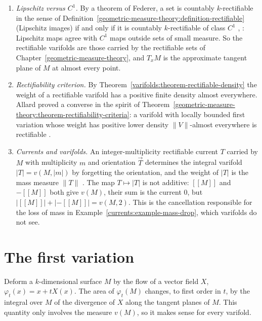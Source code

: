 \begin{remark}\label{varifolds:remark-rectifiable}
\begin{enumerate}
\item \emph{Lipschitz versus $C^1$.} By a theorem of Federer, a set is countably $k$-rectifiable in the sense of Definition~\ref{geometric-measure-theory:definition-rectifiable} (Lipschitz images) if and only if
it is countably $k$-rectifiable of class $C^1$ \cite{federer-gmt}, \cite{simon-gmt}: Lipschitz maps agree with $C^1$ maps outside sets of small measure. So the rectifiable varifolds are those carried by
the rectifiable sets of Chapter~\ref{geometric-measure-theory}, and $T_xM$ is the approximate tangent plane of $M$ at almost every point.
\item \emph{Rectifiability criterion.} By Theorem~\ref{varifolds:theorem-rectifiable-density} the weight of a rectifiable varifold has a positive finite density almost everywhere. Allard proved a converse in the
spirit of Theorem~\ref{geometric-measure-theory:theorem-rectifiability-criteria}: a varifold with locally bounded first variation whose weight has positive lower density $\|V\|$-almost everywhere is
rectifiable \cite{allard-1972}.
\item \emph{Currents and varifolds.} An integer-multiplicity rectifiable current $T$ carried by $M$ with multiplicity $m$ and orientation $\vec{T}$ determines the integral varifold $|T| = v(M, |m|)$ by
forgetting the orientation, and the weight of $|T|$ is the mass measure $\|T\|$ \cite{simon-gmt}. The map $T \mapsto |T|$ is not additive: $[\![M]\!]$ and $-[\![M]\!]$ both give $v(M)$, their sum is the
current $0$, but $|[\![M]\!]| + |-[\![M]\!]| = v(M, 2)$. This is the cancellation responsible for the loss of mass in Example~\ref{currents:example-mass-drop}, which varifolds do not see.
\end{enumerate}
\end{remark}

\section{The first variation}\label{varifolds:section-first-variation}

Deform a $k$-dimensional surface $M$ by the flow of a vector field $X$, $\varphi_t(x) = x + tX(x)$. The area of $\varphi_t(M)$ changes, to first order in $t$, by the integral over $M$ of the divergence of $X$
along the tangent planes of $M$. This quantity only involves the measure $v(M)$, so it makes sense for every varifold.

